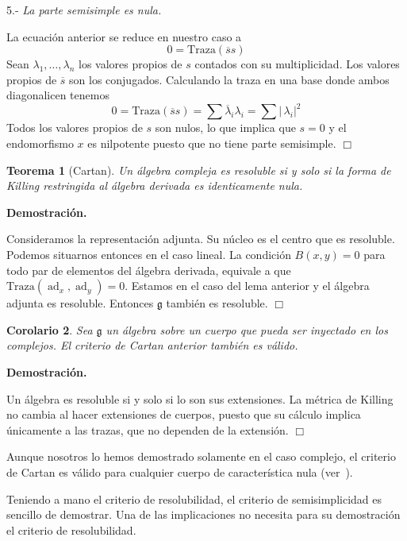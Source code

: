 \documentclass[a4paper,draft,12pt]{scrartcl}
\newtheorem{teo}{Teorema}[section]%
\newtheorem{cor}[teo]{Corolario}%
\newcommand{\dem}{\noindent \textbf{Demostración. }\vspace{0.3 cm}}%
\newcommand{\g}{\mathfrak{g}}%
\newcommand{\fin}{ $\Box $ \vspace{0.4 cm}}
\newcommand{\abs}[1]{\left|\, #1 \right|}  %
\DeclareMathOperator{\ad}{ad}  %
\begin{document}
 5.- \textit{La parte semisimple es nula.}
 
 La ecuación anterior se reduce en nuestro caso a 
 $$
 0= \mathrm{Traza}(\overline{s}s)
 $$
 Sean $\lambda_1, \dots,\lambda_n$ los valores propios de $s$ contados con su multiplicidad.  Los valores propios de $\overline{s}$ son los conjugados.  Calculando la traza en una base donde ambos diagonalicen tenemos
 $$
  0= \mathrm{Traza}(\overline{s}s)= \textstyle \sum \overline{\lambda}_i\lambda_i = \sum \abs{\lambda_i}^2
  $$
  Todos los valores propios de $s$ son nulos, lo que implica que $s=0$ y el endomorfismo $x$ es nilpotente puesto que no tiene parte semisimple.  \fin
 
 \begin{teo}[Cartan]
 
 Un álgebra compleja es resoluble si y solo si la forma de Killing restringida al álgebra derivada es identicamente nula.
 
 \end{teo}
 
 \dem
 
 
 Consideramos la representación adjunta.  Su núcleo es el centro que es resoluble.  Podemos situarnos entonces en el caso lineal.  La condición $B(x,y)=0$ para todo par de elementos del álgebra derivada, equivale a que $\mathrm{Traza}(\ad_x,\ad_y)=0$.  Estamos en el caso del lema anterior y el álgebra adjunta es resoluble.  Entonces $\g$ también es resoluble. \fin
 
 
 \begin{cor}
 
 Sea $\g$ un álgebra sobre un cuerpo que pueda ser inyectado en los complejos.  El criterio de Cartan anterior también es válido.
 
 \end{cor}
 
 \dem
 
 Un álgebra  es resoluble si y solo si lo son sus extensiones.  La métrica de Killing no cambia al hacer extensiones de cuerpos, puesto que su cálculo implica únicamente a las trazas, que no dependen de la extensión.  \fin
 
 
 Aunque nosotros lo hemos demostrado solamente en el caso complejo, el criterio de Cartan es válido para cualquier cuerpo de característica nula (ver~\cite{humint}).
 
 \bigskip
 
 
 
Teniendo a mano el criterio de resolubilidad, el criterio de semisimplicidad es sencillo de demostrar. Una de las implicaciones no necesita para su demostración el criterio de resolubilidad.
\end{document}
